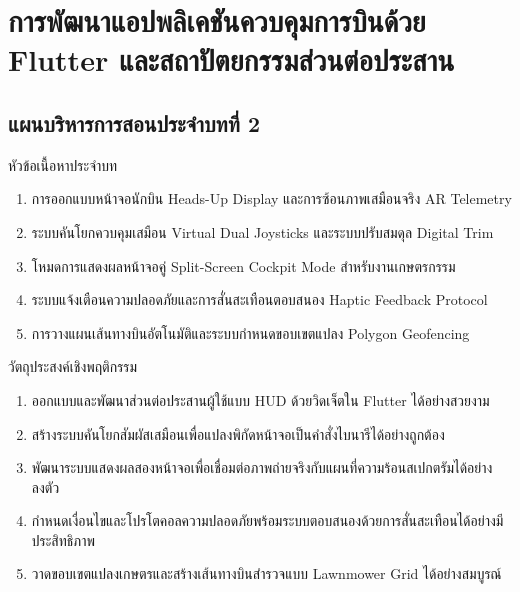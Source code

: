 \chapter{การพัฒนาแอปพลิเคชันควบคุมการบินด้วย Flutter และสถาปัตยกรรมส่วนต่อประสาน}
\label{chap:ch02}

\section*{แผนบริหารการสอนประจำบทที่ 2}

\begin{planbox}{หัวข้อเนื้อหาประจำบท}
\begin{enumerate}
    \item การออกแบบหน้าจอนักบิน Heads-Up Display และการซ้อนภาพเสมือนจริง AR Telemetry
    \item ระบบคันโยกควบคุมเสมือน Virtual Dual Joysticks และระบบปรับสมดุล Digital Trim
    \item โหมดการแสดงผลหน้าจอคู่ Split-Screen Cockpit Mode สำหรับงานเกษตรกรรม
    \item ระบบแจ้งเตือนความปลอดภัยและการสั่นสะเทือนตอบสนอง Haptic Feedback Protocol
    \item การวางแผนเส้นทางบินอัตโนมัติและระบบกำหนดขอบเขตแปลง Polygon Geofencing
\end{enumerate}
\end{planbox}

\begin{planbox}{วัตถุประสงค์เชิงพฤติกรรม}
\begin{enumerate}
    \item ออกแบบและพัฒนาส่วนต่อประสานผู้ใช้แบบ HUD ด้วยวิดเจ็ตใน Flutter ได้อย่างสวยงาม
    \item สร้างระบบคันโยกสัมผัสเสมือนเพื่อแปลงพิกัดหน้าจอเป็นคำสั่งไบนารีได้อย่างถูกต้อง
    \item พัฒนาระบบแสดงผลสองหน้าจอเพื่อเชื่อมต่อภาพถ่ายจริงกับแผนที่ความร้อนสเปกตรัมได้อย่างลงตัว
    \item กำหนดเงื่อนไขและโปรโตคอลความปลอดภัยพร้อมระบบตอบสนองด้วยการสั่นสะเทือนได้อย่างมีประสิทธิภาพ
    \item วาดขอบเขตแปลงเกษตรและสร้างเส้นทางบินสำรวจแบบ Lawnmower Grid ได้อย่างสมบูรณ์
\end{enumerate}
\end{planbox}

\newpage

